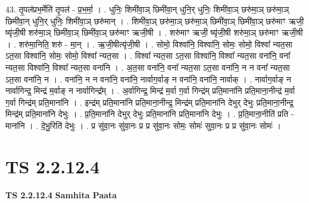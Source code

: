 \documentclass[17pt]{extarticle}
\begin{document}
43. तृ॒पल॑प्रभ॒र्मेति॑ तृ॒पल॑ - प्र॒भ॒र्मा॒ । . धुनिः॒ शिमी॑वा॒ञ् छिमी॑वा॒न् धुनि॒र् धुनिः॒ शिमी॑वा॒ञ् छरु॑मा॒ञ् छरु॑मा॒ञ् छिमी॑वा॒न् धुनि॒र् धुनिः॒ शिमी॑वा॒ञ् छरु॑मान् । . शिमी॑वा॒ञ् छरु॑मा॒ञ् छरु॑मा॒ञ् छिमी॑वा॒ञ् छिमी॑वा॒ञ् छरु॑माꣳ ऋजी॒ ष्यृ॑जी॒षी शरु॑मा॒ञ् छिमी॑वा॒ञ् छिमी॑वा॒ञ् छरु॑माꣳ ऋजी॒षी । . शरु॑माꣳ ऋजी॒ ष्यृ॑जी॒षी शरु॑मा॒ञ् छरु॑माꣳ ऋजी॒षी । . शरु॑मा॒निति॒ शरु॑ - मा॒न् । . ऋ॒जी॒षीत्यृ॑जी॒षी । . सोमो॒ विश्वा॑नि॒ विश्वा॑नि॒ सोमः॒ सोमो॒ विश्वा᳚ न्यत॒सा ऽत॒सा विश्वा॑नि॒ सोमः॒ सोमो॒ विश्वा᳚ न्यत॒सा । . विश्वा᳚ न्यत॒सा ऽत॒सा विश्वा॑नि॒ विश्वा᳚ न्यत॒सा वना॑नि॒ वना᳚ न्यत॒सा विश्वा॑नि॒ विश्वा᳚ न्यत॒सा वना॑नि । . अ॒त॒सा वना॑नि॒ वना᳚ न्यत॒सा ऽत॒सा वना॑नि॒ न न वना᳚ न्यत॒सा ऽत॒सा वना॑नि॒ न । . वना॑नि॒ न न वना॑नि॒ वना॑नि॒ नार्वाग॒र्वाङ् न वना॑नि॒ वना॑नि॒ नार्वाक् । . नार्वाग॒र्वाङ् न नार्वागिन्द्र॒ मिन्द्र॑ म॒र्वाङ् न नार्वागिन्द्र᳚म् । . अ॒र्वागिन्द्र॒ मिन्द्र॑ म॒र्वा ग॒र्वा गिन्द्र॑म् प्रति॒माना॑नि प्रति॒माना॒नीन्द्र॑ म॒र्वा ग॒र्वा गिन्द्र॑म् प्रति॒माना॑नि । . इन्द्र॑म् प्रति॒माना॑नि प्रति॒माना॒नीन्द्र॒ मिन्द्र॑म् प्रति॒माना॑नि देभुर् देभुः प्रति॒माना॒नीन्द्र॒ मिन्द्र॑म् प्रति॒माना॑नि देभुः । . प्र॒ति॒माना॑नि देभुर् देभुः प्रति॒माना॑नि प्रति॒माना॑नि देभुः । . प्र॒ति॒माना॒नीति॑ प्रति - माना॑नि । . दे॒भु॒रिति॑ देभुः । . प्र सु॑वा॒नः सु॑वा॒नः प्र प्र सु॑वा॒नः सोमः॒ सोमः॑ सुवा॒नः प्र प्र सु॑वा॒नः सोमः॑ । \newline
\pagebreak
{}
\section*{ TS 2.2.12.4 }

\textbf{TS 2.2.12.4 } \newline
\textbf{Samhita Paata} \newline
\end{document}
